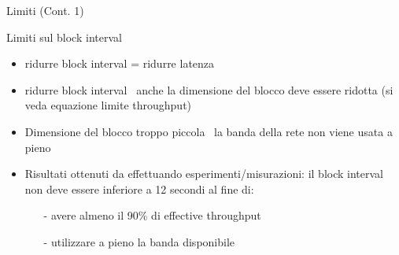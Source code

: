 \documentclass{beamer}
\begin{document}
  
  
  
  \begin{frame}{Limiti (Cont. 1)}
      \begin{block}{Limiti sul block interval}
        \begin{itemize}
            \item ridurre block interval = ridurre latenza 
            \item ridurre block interval \MVRightarrow\, anche la dimensione del blocco deve essere ridotta (si veda equazione limite throughput)
            \item Dimensione del blocco troppo piccola \MVRightarrow\, la banda della rete non viene usata a pieno
            \item Risultati ottenuti da \cite{croman-scaling-blockchain} effettuando esperimenti/misurazioni: il block interval non deve essere inferiore a 12 secondi al fine di:
            \begin{itemize}
                \item[-] avere almeno il 90\% di effective throughput
                \item[-] utilizzare a pieno la banda disponibile
            \end{itemize}
        \end{itemize}
      \end{block}
  \end{frame}
 
 
 
 
 
\end{document}
